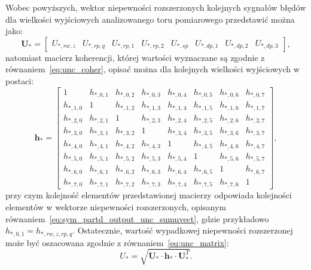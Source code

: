 Wobec powyższych, wektor niepewności rozszerzonych kolejnych sygnałów błędów dla wielkości wyjściowych analizowanego toru pomiarowego przedstawić można jako:
\begin{equation}
\mathbf{U}_{*} =
\begin{bmatrix}
U_{*,rw,z} & U_{*,rp,q} & U_{*,rp,1} & U_{*,rp,2} & U_{*,sp} & U_{*,dp,1} & U_{*,dp,2} & U_{*,dp,3}
\end{bmatrix}
\label{eq:sym_partd_output_unc_sumuvect},
\end{equation}
natomiast macierz koherencji, której wartości wyznaczane są zgodnie z równaniem~\eqref{eq:unc_coher}, opisać można dla kolejnych wielkości wyjściowych w postaci:
\begin{equation}
\mathbf{h}_{*} =
\begin{bmatrix}
1 & h_{*,0,1} & h_{*,0,2} & h_{*,0,3} & h_{*,0,4} & h_{*,0,5} & h_{*,0,6} & h_{*,0,7} \\
h_{*,1,0} & 1 & h_{*,1,2} & h_{*,1,3} & h_{*,1,4} & h_{*,1,5} & h_{*,1,6} & h_{*,1,7} \\
h_{*,2,0} & h_{*,2,1} & 1 & h_{*,2,3} & h_{*,2,4} & h_{*,2,5} & h_{*,2,6} & h_{*,2,7} \\
h_{*,3,0} & h_{*,3,1} & h_{*,3,2} & 1 & h_{*,3,4} & h_{*,3,5} & h_{*,3,6} & h_{*,3,7} \\
h_{*,4,0} & h_{*,4,1} & h_{*,4,2} & h_{*,4,3} & 1 & h_{*,4,5} & h_{*,4,6} & h_{*,4,7} \\
h_{*,5,0} & h_{*,5,1} & h_{*,5,2} & h_{*,5,3} & h_{*,5,4} & 1 & h_{*,5,6} & h_{*,5,7} \\
h_{*,6,0} & h_{*,6,1} & h_{*,6,2} & h_{*,6,3} & h_{*,6,4} & h_{*,6,5} & 1 & h_{*,6,7} \\
h_{*,7,0} & h_{*,7,1} & h_{*,7,2} & h_{*,7,3} & h_{*,7,4} & h_{*,7,5} & h_{*,7,6} & 1
\end{bmatrix}
\label{eq:sym_partd_output_unc_cohermat},
\end{equation}
przy czym kolejność elementów przedstawionej macierzy odpowiada kolejności elementów w wektorze niepewności rozszerzonych, opisanym równaniem~\eqref{eq:sym_partd_output_unc_sumuvect}, gdzie przykładowo $h_{*,0,1} = h_{*,rw,z,rp,q}$. Ostatecznie, wartość wypadkowej niepewności rozszerzonej może być oszacowana zgodnie z równaniem~\eqref{eq:unc_matrix}:
\begin{equation}
U_{*} = \sqrt{\mathbf{U}_{*} \cdot \mathbf{h}_{*} \cdot \mathbf{U}_{*}^{T}} \label{eq:sym_partd_output_unc_totalmat}.
\end{equation}

